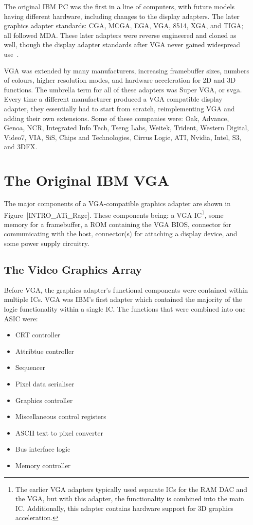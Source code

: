 The original IBM PC was the first in a line of computers, with future models
having different hardware, including changes to the display adapters. The later
graphics adapter standards: CGA, MCGA, EGA, VGA, 8514, XGA, and TIGA; all
followed MDA. These later adapters were reverse engineered and cloned as well,
though the display adapter standards after VGA never gained widespread
use~\cite{VGA_Programmers}.

VGA was extended by many manufacturers, increasing framebuffer sizes, numbers of
colours, higher resolution modes, and hardware acceleration for 2D and 3D
functions. The umbrella term for all of these adapters was Super
VGA, or \gls{svga}. Every time a
different manufacturer produced a VGA compatible display adapter, they
essentially had to start from scratch, reimplementing VGA and adding their own
extensions. Some of these companies were: Oak, Advance, Genoa, NCR, Integrated
Info Tech, Tseng Labs, Weitek, Trident, Western Digital, Video7, VIA, SiS, Chips
and Technologies, Cirrus Logic, ATI, Nvidia, Intel, S3, and 3DFX.


\section{The Original IBM VGA}
The major components of a VGA-compatible graphics adapter are shown in
Figure~\ref{INTRO_ATi_Rage}. These components being: a VGA IC\footnote{The
earlier VGA adapters typically used separate ICs for the RAM DAC and the VGA, but
with this adapter, the functionality is combined into the main IC. Additionally,
this adapter contains hardware support for 3D graphics acceleration.}, some
memory for a framebuffer, a ROM containing the VGA BIOS, connector for
communicating with the host, connector(s) for attaching a display device, and
some power supply circuitry.


\subsection{The Video Graphics Array}
Before VGA, the graphics adapter's functional components were contained within
multiple ICs. VGA was IBM's first adapter which contained the majority of the
logic functionality within a single IC. The functions that were combined
into one ASIC were:

\begin{itemize}
  \item CRT controller
  \item Attribtue controller
  \item Sequencer
  \item Pixel data serialiser
  \item Graphics controller
  \item Miscellaneous control registers
  \item ASCII text to pixel converter
  \item Bus interface logic
  \item Memory controller
\end{itemize}


